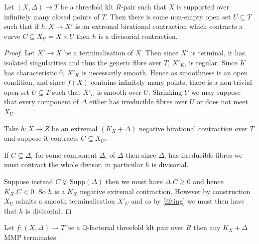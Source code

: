 	
	\begin{theorem}
		Let $(X,\Delta) \to T$ be a threefold klt $R$-pair such that $X$ is supported over infinitely many closed points of $T$. Then there is some non-empty open set $U \subseteq T$ such that if $h:X \to X'$ is an extremal birational contraction which contracts a curve $C\subseteq X_{U}=X\times U$ then $h$ is a divisorial contraction.
	\end{theorem}
	
	\begin{proof}
		
		Let $X' \to X$ be a terminalisation of $X$. Then since $X'$ is terminal, it has isolated singularities and thus the generic fibre over $T$, $X'_{K}$, is regular. Since $K$ has characteristic $0$, $X'_{K}$ is necessarily smooth. Hence as smoothness is an open condition, and since $f(X)$ contains infinitely many points, there is a non-trivial open set $U \subseteq T$ such that $X'_{U}$ is smooth over $U$. Shrinking $U$ we may suppose that every component of $\Delta$ either has irreducible fibres over $U$ or does not meet $X_{U}$. 
		
		Take $h:X \to Z$ be an extremal $(K_{X}+\Delta)$ negative birational contraction over $T$ and suppose it contracts $C \subseteq X_{U}$. 
		
		If $C \subseteq \Delta_{i}$ for some component $\Delta_{i}$ of $\Delta$ then since $\Delta_{i}$ has irreducible fibres we must contract the whole divisor, in particular $h$ is divisorial.
		
		Suppose instead $C \nsubseteq \text{Supp}(\Delta)$ then we must have $\Delta.C \geq 0$ and hence $K_{X}.C < 0$. So $h$ is a $K_{X}$ negative extremal contraction. However by construction $X_{U}$ admits a smooth terminalisation $X'_{U}$ and so by \autoref{lifting} we must then have that $h$ is divisorial.
	\end{proof}
	
	\begin{corollary}\label{termination}
		Let $f:(X,\Delta) \to T$ be a $\mathbb{Q}$-factorial threefold klt pair over $R$ then any $K_{X}+\Delta$ MMP terminates.
	\end{corollary}
	
